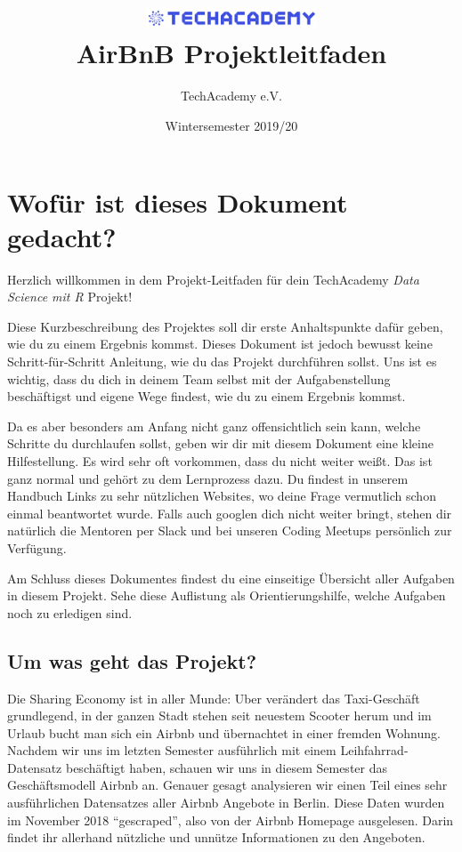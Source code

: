 \documentclass[
]{book}
\title{\includegraphics[width=2in,height=\textheight]{plots/TA_Logo.png}\\
AirBnB Projektleitfaden}
\author{TechAcademy e.V.}
\date{Wintersemester 2019/20}
\begin{document}
\maketitle

{
\setcounter{tocdepth}{1}
\tableofcontents
}
\hypertarget{wofuxfcr-ist-dieses-dokument-gedacht}{%
\chapter{Wofür ist dieses Dokument gedacht?}\label{wofuxfcr-ist-dieses-dokument-gedacht}}

Herzlich willkommen in dem Projekt-Leitfaden für dein TechAcademy \emph{Data Science mit R} Projekt!

Diese Kurzbeschreibung des Projektes soll dir erste Anhaltspunkte dafür geben, wie du zu einem Ergebnis kommst. Dieses Dokument ist jedoch bewusst keine Schritt-für-Schritt Anleitung, wie du das Projekt durchführen sollst. Uns ist es wichtig, dass du dich in deinem Team selbst mit der Aufgabenstellung beschäftigst und eigene Wege findest, wie du zu einem Ergebnis kommst.

Da es aber besonders am Anfang nicht ganz offensichtlich sein kann, welche Schritte du durchlaufen sollst, geben wir dir mit diesem Dokument eine kleine Hilfestellung. Es wird sehr oft vorkommen, dass du nicht weiter weißt. Das ist ganz normal und gehört zu dem Lernprozess dazu. Du findest in unserem Handbuch Links zu sehr nützlichen Websites, wo deine Frage vermutlich schon einmal beantwortet wurde. Falls auch googlen dich nicht weiter bringt, stehen dir natürlich die Mentoren per Slack und bei unseren Coding Meetups persönlich zur Verfügung.

Am Schluss dieses Dokumentes findest du eine einseitige Übersicht aller Aufgaben in diesem Projekt.
Sehe diese Auflistung als Orientierungshilfe, welche Aufgaben noch zu erledigen sind.

\hypertarget{um-was-geht-das-projekt}{%
\section{Um was geht das Projekt?}\label{um-was-geht-das-projekt}}

Die Sharing Economy ist in aller Munde: Uber verändert das Taxi-Geschäft grundlegend, in der ganzen Stadt stehen seit neuestem Scooter herum und im Urlaub bucht man sich ein Airbnb und übernachtet in einer fremden Wohnung.
Nachdem wir uns im letzten Semester ausführlich mit einem Leihfahrrad-Datensatz beschäftigt haben, schauen wir uns in diesem Semester das Geschäftsmodell Airbnb an.
Genauer gesagt analysieren wir einen Teil eines sehr ausführlichen Datensatzes aller Airbnb Angebote in Berlin.
Diese Daten wurden im November 2018 ``gescraped'', also von der Airbnb Homepage ausgelesen.
Darin findet ihr allerhand nützliche und unnütze Informationen zu den Angeboten.
\end{document}
